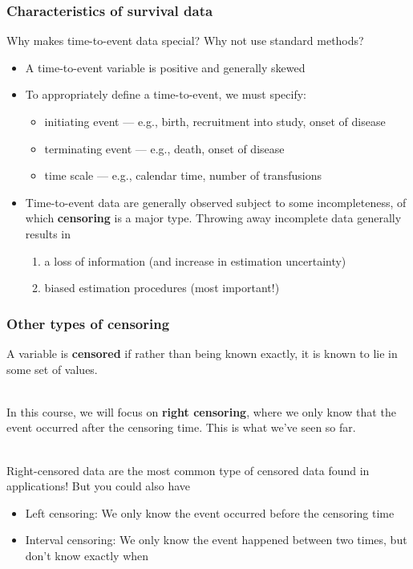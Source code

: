 \documentclass[10pt,t]{beamer}
\begin{document}
\begin{frame}
\frametitle{Characteristics of survival data}
Why makes time-to-event data special? Why not use standard methods?\pause
\begin{itemize}
\item A time-to-event variable is positive and generally skewed\pause 
\item To appropriately define a time-to-event, we must specify:\pause 
{\scriptsize
\begin{itemize}
\item initiating event --- e.g., birth, recruitment into study, onset of disease \pause 
\item terminating event --- e.g., death, onset of disease\pause 
\item time scale --- e.g., calendar time, number of transfusions\pause 
\end{itemize}
}
\item Time-to-event data are generally observed subject to some incompleteness, of which \textbf{censoring} is a major type. Throwing away incomplete data generally results in
{\scriptsize
\begin{enumerate}
\item a loss of information (and increase in estimation uncertainty)
\item biased estimation procedures (most important!)
\end{enumerate}
}
\end{itemize}

\end{frame}

\begin{frame}
\frametitle{Other types of censoring}
A variable is \textbf{censored} if rather than being known exactly, it is known to lie in some set of values.
\\ ~\ 

In this course, we will focus on \textbf{right censoring}, where we only know that the event occurred after the censoring time. This is what we've seen so far. 
\\ ~\ 

Right-censored data are the most common type of censored data found in applications! But you could also have\pause 
\begin{itemize}
	\item Left censoring: We only know the event occurred before the censoring time\pause 
	\item Interval censoring: We only know the event happened between two times, but don't know exactly when
\end{itemize}
\end{frame}
\end{document}
